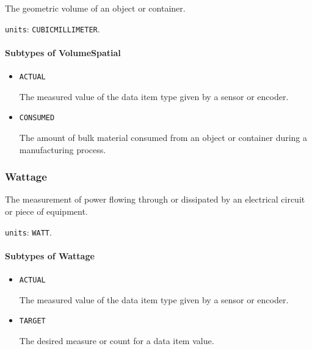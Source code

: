 The geometric volume of an object or container.


\texttt{units}: \texttt{CUBIC\textunderscore MILLIMETER}.

\paragraph{Subtypes of VolumeSpatial}\mbox{}
\label{sec:Subtypes of VolumeSpatial}

\begin{itemize}

\item \texttt{ACTUAL}


The measured value of the data item type given by a sensor or encoder.

\item \texttt{CONSUMED}


The amount of bulk material consumed from an object or container during a manufacturing process.


\end{itemize}





\subsubsection{Wattage}
\label{sec:Wattage}



The measurement of power flowing through or dissipated by an electrical circuit or piece of equipment.


\texttt{units}: \texttt{WATT}.

\paragraph{Subtypes of Wattage}\mbox{}
\label{sec:Subtypes of Wattage}

\begin{itemize}

\item \texttt{ACTUAL}


The measured value of the data item type given by a sensor or encoder.

\item \texttt{TARGET}


The desired measure or count for a data item value.


\end{itemize}





